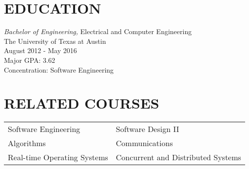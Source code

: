 \documentclass[line,margin]{res}
\begin{document}

\address{Phone: (512) 577-7517 Email: matthewzhan@utexas.edu}
\address{LinkedIn: \url{http://lnked.in/zhan}}

 
\begin{resume}
 
 
 
 
\section{EDUCATION} {\sl Bachelor of Engineering,} Electrical and Computer Engineering \\
			   The University of Texas at Austin \\
                August 2012 - May 2016 \\
                Major GPA: 3.62 \\
                Concentration: Software Engineering

                \section{RELATED COURSES}
                \iffalse
                \begin{tabular}{ l l }


                \end{tabular}
                \fi

                \begin{tabularx}{\textwidth}{@{}XX@{}}

                  Software Engineering & Software Design II \\

                  Algorithms & Communications \\

                  Real-time Operating Systems & Concurrent and Distributed Systems \\


\end{tabularx}
\end{resume}
\end{document}
